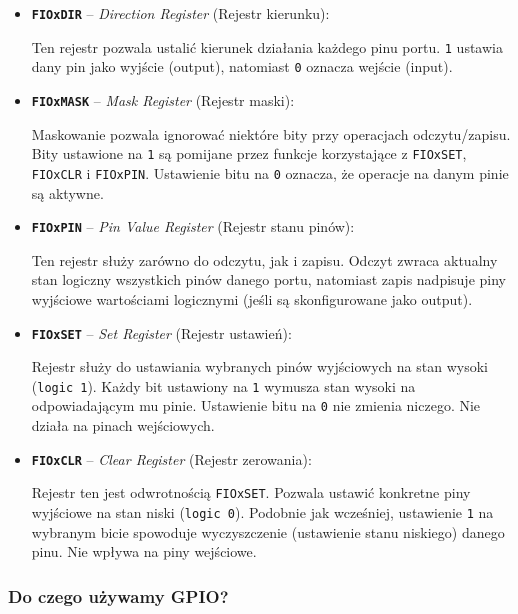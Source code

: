 \begin{itemize}
    \item \textbf{\texttt{FIOxDIR}} – \textit{Direction Register} (Rejestr kierunku):

    Ten rejestr pozwala ustalić kierunek działania każdego pinu portu. 
    \texttt{1} ustawia dany pin jako wyjście (output), natomiast \texttt{0} oznacza wejście (input). 


    \item \textbf{\texttt{FIOxMASK}} – \textit{Mask Register} (Rejestr maski):

    Maskowanie pozwala ignorować niektóre bity przy operacjach odczytu/zapisu. 
    Bity ustawione na \texttt{1} są pomijane przez funkcje korzystające z \texttt{FIOxSET}, \texttt{FIOxCLR} i \texttt{FIOxPIN}. 
    Ustawienie bitu na \texttt{0} oznacza, że operacje na danym pinie są aktywne.


    \item \textbf{\texttt{FIOxPIN}} – \textit{Pin Value Register} (Rejestr stanu pinów):

    Ten rejestr służy zarówno do odczytu, jak i zapisu. 
    Odczyt zwraca aktualny stan logiczny wszystkich pinów danego portu, natomiast zapis nadpisuje piny wyjściowe wartościami logicznymi (jeśli są skonfigurowane jako output).


    \item \textbf{\texttt{FIOxSET}} – \textit{Set Register} (Rejestr ustawień):

    Rejestr służy do ustawiania wybranych pinów wyjściowych na stan wysoki (\texttt{logic 1}). 
    Każdy bit ustawiony na \texttt{1} wymusza stan wysoki na odpowiadającym mu pinie. 
    Ustawienie bitu na \texttt{0} nie zmienia niczego. Nie działa na pinach wejściowych.


    \item \textbf{\texttt{FIOxCLR}} – \textit{Clear Register} (Rejestr zerowania):

    Rejestr ten jest odwrotnością \texttt{FIOxSET}. Pozwala ustawić konkretne piny wyjściowe na stan niski (\texttt{logic 0}). 
    Podobnie jak wcześniej, ustawienie \texttt{1} na wybranym bicie spowoduje wyczyszczenie (ustawienie stanu niskiego) danego pinu. 
    Nie wpływa na piny wejściowe.

\end{itemize}

\subsubsection{Do czego używamy GPIO?}

